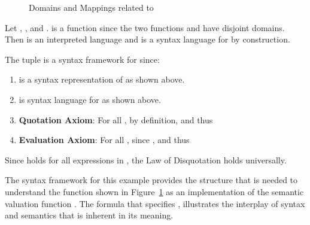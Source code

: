 \documentclass[11pt,fleqn]{article}
\newcommand{\be}{\begin{enumerate}}
\newcommand{\ee}{\end{enumerate}}
\begin{document}
\begin{figure}
\center
{}
\caption{Domains and Mappings related to } \label{fig:impl-lang}
\end{figure}

Let , , and . 
is a function since the two functions  and  have disjoint domains. Then  is an
interpreted language and  is a syntax language for
 by construction.

The tuple  is a syntax framework for
 since: 

\be

  \item  is a syntax representation of  as shown above.

  \item  is syntax language for  as shown above.

  \item \textbf{Quotation Axiom}: For all ,
     by definition, and thus
    

  \item \textbf{Evaluation Axiom}: For all ,
     since ,
    and thus
    
\ee
\noindent
Since  holds for all
expressions in , the Law of Disquotation holds
universally.

The syntax framework for this example provides the structure that is
needed to understand the function  shown in
Figure~\ref{fig:impl-lang} as an implementation of the semantic
valuation function . The formula that specifies
, 
illustrates the interplay of syntax and semantics that is inherent in
its meaning.
\end{document}

